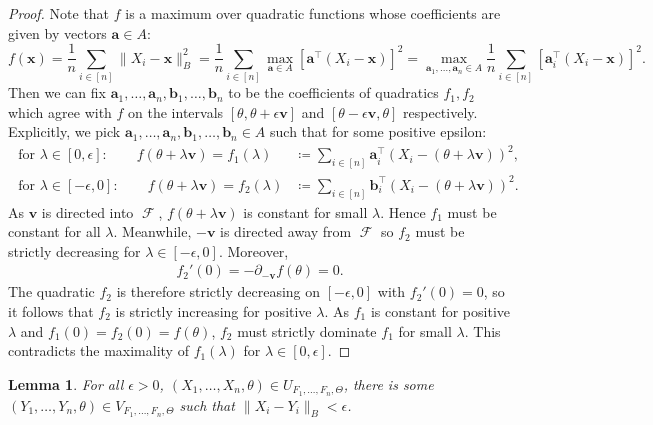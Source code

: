 \documentclass[10pt]{article}
\newtheorem{lemma}[theorem]{Lemma}
\theoremstyle{definition}
\theoremstyle{remark}
\newcommand{\T}{\intercal}
\newcommand{\CType}{F_1,\dots,F_n}
\DeclareMathOperator{\FMset}{\mathcal{F}}
\renewcommand{\vec}[1]{\mathbf{#1}}
\begin{document}
\begin{proof}
		Note that $f$ is a maximum over quadratic functions whose coefficients are given by vectors $\vec a \in A$:
		\[
		f(\vec x) = \textstyle \frac{1}{n} \sum_{i \in [n]} \|X_i - \vec x \|_B^2 =  \frac{1}{n} \sum_{i \in [n]} \max_{\vec a \in A} \left[ \vec a^{\T}(X_i- \vec x) \right]^2 =  \max_{\vec a_1,\dots, \vec a_n \in A}  \frac{1}{n} \sum_{i \in [n]} \left[\vec a_i^{\T}(X_i- \vec x)\right]^2.
		\]
		Then we can fix $\vec a_1,\dots, \vec a_n, \vec b_1, \dots, \vec b_n$ to be the coefficients of quadratics $f_1, f_2$ which agree with $f$ on the intervals $[\theta, \theta+\epsilon \vec v]$ and $[\theta - \epsilon \vec v, \theta]$ respectively. Explicitly, we pick $\vec a_1,\dots, \vec a_n, \vec b_1, \dots, \vec b_n \in A$ such that for some positive epsilon:
		\begin{align*}
			\text{ for }\lambda \in [0,\epsilon]:  \qquad f(\theta + \lambda \vec v) = f_1(\lambda) &\coloneqq \textstyle \sum_{i \in [n]} \vec a_i^{\T}(X_i-(\theta + \lambda \vec v))^2, \\
			\text{ for }\lambda \in [-\epsilon,0]:  \qquad f(\theta + \lambda \vec v) = f_2(\lambda) &\coloneqq \textstyle\sum_{i \in [n]} \vec b_i^{\T}(X_i-(\theta + \lambda \vec v))^2. 
		\end{align*}
		As $\vec v$ is directed into $\FMset$, $f(\theta+\lambda \vec v)$ is constant for small $\lambda$. Hence $f_1$ must be constant for all $\lambda$. Meanwhile, $-\vec v$ is directed away from $\FMset$ so $f_2$ must be strictly decreasing for $\lambda \in [-\epsilon,0]$. Moreover,
		\begin{align*}
			f_2'(0)  = -\partial_{-\vec v}f(\theta) = 0.
		\end{align*}  
		The quadratic $f_2$ is therefore strictly decreasing on $[-\epsilon,0]$ with $f_2'(0) = 0$, so it follows that $f_2$ is strictly increasing for positive $\lambda$. As $f_1$ is constant for positive $\lambda$ and $f_1(0) = f_2(0) = f(\theta)$, $f_2$ must strictly dominate $f_1$ for small $\lambda$. This contradicts the maximality of $ f_1(\lambda)$ for $\lambda \in [0,\epsilon]$.
	\end{proof}
	
	\begin{lemma}\label{lemma:U_in_ClV}
		For all $\epsilon > 0$, $(X_1,\dots, X_n,\theta) \in U_{F_1,\dots, F_n,\Theta}$, there is some $(Y_1, \dots, Y_n,\theta) \in V_{\CType, \Theta}$ such that $\|X_i - Y_i\|_B < \epsilon$.
	\end{lemma}
	
\end{document}

